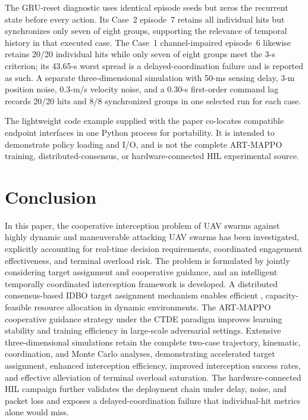\documentclass[lettersize,journal]{IEEEtran}
\providecommand{\DIFadd}[1]{{\protect\color{blue} #1}} %
\providecommand{\DIFdel}[1]{} %
\providecommand{\DIFaddbegin}{} %
\providecommand{\DIFaddend}{} %
\providecommand{\DIFdelbegin}{} %
\providecommand{\DIFdelend}{} %
\begin{document}
\DIFadd{The GRU-reset diagnostic uses identical episode seeds but zeros the recurrent
state before every action. Its Case~2 episode~7 retains all individual hits but
synchronizes only seven of eight groups, supporting the relevance of temporal
history in that executed case. The Case~1 channel-impaired episode~6 likewise
retains 20/20 individual hits while only seven of eight groups meet the 3-s
criterion; its 43.65-s worst spread is a delayed-coordination failure and is
reported as such. A separate three-dimensional simulation with 50-ms sensing
delay, 3-m position noise, 0.3-m/s velocity noise, and a 0.30-s first-order
command lag records 20/20 hits and 8/8 synchronized groups in one selected run
for each case.
}

\DIFadd{The lightweight code example supplied with the paper co-locates compatible
endpoint interfaces in one Python process for portability. It is intended to
demonstrate policy loading and I/O, and is not the complete ART-MAPPO training,
distributed-consensus, or hardware-connected HIL experimental source.
}



\DIFaddend %
\section{Conclusion}
\label{sec:conclusion}

In this paper, the cooperative interception problem of UAV swarms against highly dynamic and
maneuverable attacking UAV swarms has been investigated, explicitly accounting for real-time
decision requirements, coordinated engagement effectiveness, and terminal overload risk.
The problem is formulated by jointly considering target assignment and cooperative guidance,
and an intelligent temporally coordinated interception framework is developed.
A \DIFdelbegin \DIFdel{fast IDBO-based }\DIFdelend \DIFaddbegin \DIFadd{distributed consensus-based IDBO }\DIFaddend target assignment mechanism enables
efficient\DIFdelbegin \DIFdel{and accurate }\DIFdelend \DIFaddbegin \DIFadd{, capacity-feasible }\DIFaddend resource allocation in dynamic environments.
The ART-MAPPO cooperative guidance strategy under the CTDE paradigm improves learning
stability and training efficiency in large-scale adversarial settings.
Extensive \DIFdelbegin \DIFdel{simulations demonstrate }\DIFdelend \DIFaddbegin \DIFadd{three-dimensional simulations retain the complete two-case trajectory,
kinematic, coordination, and Monte Carlo analyses, demonstrating }\DIFaddend accelerated
target assignment, enhanced interception efficiency, improved interception
success rates, and effective alleviation of terminal overload saturation. \DIFaddbegin \DIFadd{The
hardware-connected HIL campaign further validates the deployment chain under
delay, noise, and packet loss and exposes a delayed-coordination failure that
individual-hit metrics alone would miss.
}\DIFaddend 
\end{document}
